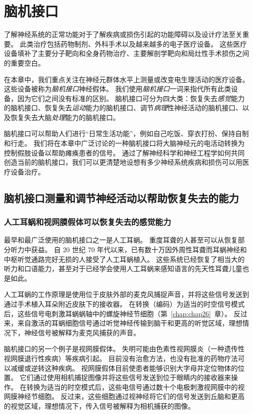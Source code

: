 \chapter{脑机接口} \label{chap:chap39}

了解神经系统的正常功能对于了解疾病或损伤引起的功能障碍以及设计疗法至关重要。
此类治疗包括药物制剂、外科手术以及越来越多的电子医疗设备。
这些医疗设备填补了主要分子靶向和全身药物治疗、主要解剖学靶向和局灶性手术损伤之间的重要空白。



在本章中，我们重点关注在神经元群体水平上测量或改变电生理活动的医疗设备。
这些设备被称为\textit{脑机接口}神经假体。
我们使用\textit{脑机接口}一词来指代所有此类设备，因为它们之间没有标准的区别。
脑机接口可分为四大类：恢复失去\textit{感觉}能力的脑机接口、恢复失去\textit{运动}能力的脑机接口、调节\textit{病理}性神经活动的脑机接口、以及恢复失去大脑\textit{处理}能力的脑机接口。


脑机接口可以帮助人们进行“日常生活功能”，例如自己吃饭、穿衣打扮、保持自制和行走。
我们将在本章中广泛讨论的一种脑机接口将大脑神经元的电活动转换为控制假肢设备以帮助瘫痪患者的信号。
通过了解神经科学和神经工程学如何共同创造当前的脑机接口，我们可以更清楚地设想有多少神经系统疾病和损伤可以用医疗设备治疗。



\section{脑机接口测量和调节神经活动以帮助恢复失去的能力}

\subsection{人工耳蜗和视网膜假体可以恢复失去的感觉能力}

最早和最广泛使用的脑机接口之一是人工耳蜗。
重度耳聋的人甚至可以从恢复部分听力中获益。
自 20 世纪 70 年代以来，已有数十万因外周性耳聋而耳蜗神经和中枢听觉通路完好无损的人接受了人工耳蜗植入。
这些系统已经恢复了相当大的听力和口语能力，甚至对于已经学会使用人工耳蜗来感知语言的先天性耳聋儿童也是如此。


人工耳蜗的工作原理是使用位于皮肤外部的麦克风捕捉声音，并将这些信号发送到通过手术植入耳朵附近皮肤下的接收器。
在转换（编码）为适当的时空信号模式后，这些信号电刺激耳蜗蜗轴中的螺旋神经节细胞（第~\ref{chap:chap26}~章）。
反过来，来自激活的耳蜗细胞信号通过听觉神经传输到脑干和更高的听觉区域，理想情况下，神经信号被解释为麦克风捕获的声音。


脑机接口的另一个例子是视网膜假体。
失明可能由色素性视网膜炎（一种遗传性视网膜退行性疾病）等疾病引起。
目前没有治愈方法，也没有批准的药物疗法可以减缓或逆转这种疾病。
视网膜假体目前使患者能够识别大字母并定位物体的位置。
它们通过使用相机捕捉图像并将这些信号发送到位于眼睛内的接收器来操作。
在转换为适当的时空模式后，这些电信号通过数十个电极刺激视网膜中的视网膜神经节细胞。
反过来，这些细胞通过视神经将它们的信号发送到丘脑和更高的视觉区域，理想情况下，传入信号被解释为相机捕获的图像。



